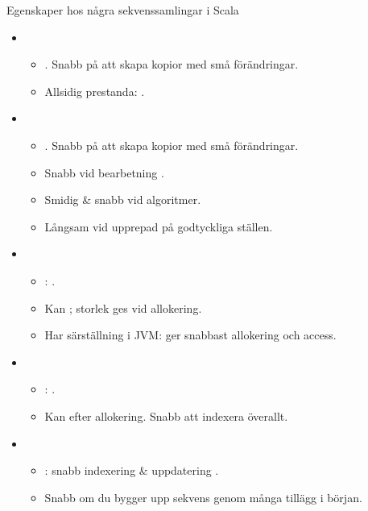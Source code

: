 \begin{Slide}{Egenskaper hos några sekvenssamlingar i Scala}
\vspace{-0.5em}
\begin{itemize}\SlideFontSmall

\item {}
  \begin{itemize}\SlideFontSmall
  \item {}. Snabb på att skapa kopior med små förändringar.
  \item Allsidig prestanda: .
  \end{itemize}

\item {}
  \begin{itemize}\SlideFontSmall
  \item {}. Snabb på att skapa kopior med små förändringar.
  \item Snabb vid bearbetning .
  \item Smidig \& snabb vid  algoritmer.
  \item Långsam vid upprepad  på godtyckliga ställen.
  \end{itemize}

\item {}
  \begin{itemize}\SlideFontSmall
  \item {}: .
  \item Kan ; storlek ges vid allokering.
  \item Har särställning i JVM: ger snabbast allokering och access.
  \end{itemize}

\item {}
  \begin{itemize}\SlideFontSmall
  \item {}: .
  \item Kan  efter allokering. Snabb att indexera överallt.
  \end{itemize}

\item {}
  \begin{itemize}\SlideFontSmall
  \item {}: snabb indexering \& uppdatering .
  \item Snabb om du bygger upp sekvens genom många tillägg i början.
  \end{itemize}

\end{itemize}
\end{Slide}

